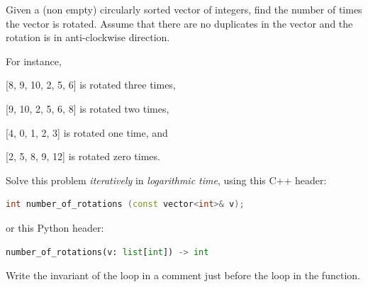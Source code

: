 

\Statement

Given a (non empty) circularly sorted vector of integers, find the number of
times the vector is rotated. Assume that there are no duplicates in the vector
and the rotation is in anti-clockwise direction.

\medskip

For instance,
\begin{itemize*}
\item {} [8, 9, 10, 2, 5, 6] is rotated three times,
\item {} [9, 10, 2, 5, 6, 8] is rotated two times,
\item {} [4, 0, 1, 2, 3] is rotated one time, and
\item {} [2, 5, 8, 9, 12] is rotated zero times.
\end{itemize*}

\medskip

Solve this problem \emph{iteratively}
in \emph{logarithmic time}, using this C++ header:

\begin{lstlisting}[language=C++,morekeywords={string,vector}]
    int number_of_rotations (const vector<int>& v);
\end{lstlisting}

or this Python header:

\begin{lstlisting}[language=Python]
    number_of_rotations(v: list[int]) -> int
\end{lstlisting}

\medskip

Write the invariant of the loop in a comment
just before the loop in the function.

\ObservationNoMain
